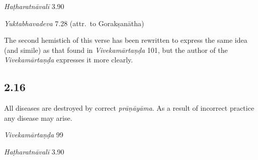 \begin{ekdosis}
\begin{testimonia}[hp02_015]
\emph{Haṭharatnāvalī} 3.90

\begin{versinnote}
\end{versinnote}

\emph{Yuktabhavadeva} 7.28 (attr.~to Gorakṣanātha)
\begin{versinnote}
\end{versinnote}

\end{testimonia}

\begin{philcomm}[hp02_015]
The second hemistich of this verse has been rewritten to express the same idea (and simile) as that found in \emph{Viveka\-mārtaṇḍa} 101, but the author of the \emph{Viveka\-mārtaṇḍa} expresses it more clearly.
\end{philcomm}

\subsection*{2.16}
\begin{translation}[hp02_016]
All diseases are destroyed by correct \emph{prāṇāyāma}. As a result of incorrect practice any disease may arise.
\end{translation}

\begin{sources}[hp02_016]
\emph{Vivekamārtaṇḍa} 99

\begin{versinnote}
\end{versinnote}
\end{sources}

\begin{testimonia}[hp02_016]
\emph{Haṭharatnāvalī} 3.90

\begin{versinnote}
\end{versinnote}


\end{testimonia}
\end{ekdosis}

